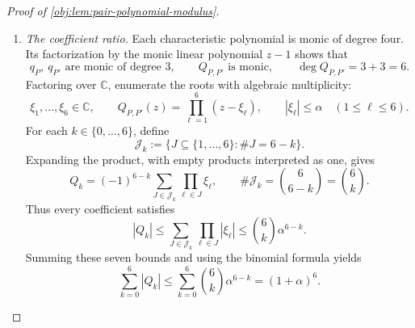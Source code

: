 \documentclass[11pt]{article}
\begin{document}
\begin{proof}[Proof of \cref{obj:lem:pair-polynomial-modulus}]
\begin{enumerate}
Apply this estimate to two rows of \(P\). For every \(i,j\in\mathcal S\),
\[
\begin{aligned}
|(P\varphi)(i)-(P\varphi)(j)|
&=\left|\sum_s(P_{is}-P_{js})\varphi(s)\right|\\
&\le d_\varphi\tau\bigl(P(i,\cdot),P(j,\cdot)\bigr)\\
&\le d_\varphi\delta(P)
\le\alpha d_\varphi.
\end{aligned}
\]
Choose a pair attaining the diameter of \(f_{\mathbb C}\):
\[
i_{\mathrm{diam}},j_{\mathrm{diam}}\in\mathcal S,\qquad
|f_{\mathbb C}(i_{\mathrm{diam}})
 -f_{\mathbb C}(j_{\mathrm{diam}})|=d_f.
\]
Using the eigenvector equation in the preceding contraction estimate gives
\[
\begin{aligned}
|z|\,d_f
&=|zf_{\mathbb C}(i_{\mathrm{diam}})
     -zf_{\mathbb C}(j_{\mathrm{diam}})|\\
&=|(Pf_{\mathbb C})(i_{\mathrm{diam}})
     -(Pf_{\mathbb C})(j_{\mathrm{diam}})|\\
&\le\alpha d_f.
\end{aligned}
\]
Since \(d_f>0\), division gives \(|z|\le\alpha\).
In the second case, \(q_{P'}(z)=0\), the same argument uses \(P'\) and
\(\delta(P')\le\alpha\). We have therefore proved
\[
Q_{P,P'}(z)=0\quad\Longrightarrow\quad |z|\le\alpha
\qquad(z\in\mathbb C).
\]

\item \emph{The coefficient ratio.}
Each characteristic polynomial is monic of degree four.
Its factorization by the monic linear polynomial \(z-1\) shows that
\[
q_P,\ q_{P'}\text{ are monic of degree }3,
\qquad
Q_{P,P'}\text{ is monic},\qquad
\deg Q_{P,P'}=3+3=6.
\]
Factoring over \(\mathbb C\), enumerate the roots with algebraic multiplicity:
\[
\xi_1,\ldots,\xi_6\in\mathbb C,\qquad
Q_{P,P'}(z)=\prod_{\ell=1}^6(z-\xi_\ell),
\qquad |\xi_\ell|\le\alpha\quad(1\le\ell\le6).
\]
For each \(k\in\{0,\ldots,6\}\), define
\[
\mathcal J_k
:=\{J\subseteq\{1,\ldots,6\}:\#J=6-k\}.
\]
Expanding the product, with empty products interpreted as one, gives
\[
Q_k=(-1)^{6-k}
      \sum_{J\in\mathcal J_k}\prod_{\ell\in J}\xi_\ell,
\qquad
\#\mathcal J_k=\binom6{6-k}=\binom6k.
\]
Thus every coefficient satisfies
\[
|Q_k|
\le\sum_{J\in\mathcal J_k}\prod_{\ell\in J}|\xi_\ell|
\le\binom6k\alpha^{6-k}.
\]
Summing these seven bounds and using the binomial formula yields
\[
\sum_{k=0}^6|Q_k|
\le\sum_{k=0}^6\binom6k\alpha^{6-k}
=(1+\alpha)^6.
\]


\end{enumerate}
\end{proof}
\end{document}
